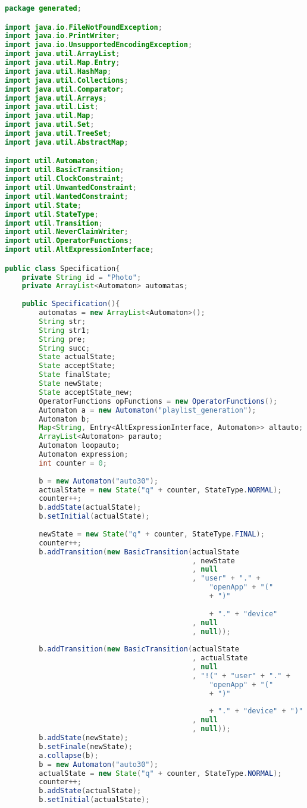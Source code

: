 \begin{lstlisting}[language=java, caption={\textit{Specification} osztály.},captionpos=b,label=specification_class]
package generated;

import java.io.FileNotFoundException;
import java.io.PrintWriter;
import java.io.UnsupportedEncodingException;
import java.util.ArrayList;
import java.util.Map.Entry;
import java.util.HashMap;
import java.util.Collections;
import java.util.Comparator;
import java.util.Arrays;
import java.util.List;
import java.util.Map;
import java.util.Set;
import java.util.TreeSet;
import java.util.AbstractMap;

import util.Automaton;
import util.BasicTransition;
import util.ClockConstraint;
import util.UnwantedConstraint;
import util.WantedConstraint;
import util.State;
import util.StateType;
import util.Transition;
import util.NeverClaimWriter;
import util.OperatorFunctions;
import util.AltExpressionInterface;

public class Specification{
	private String id = "Photo";
	private ArrayList<Automaton> automatas;
	
	public Specification(){
		automatas = new ArrayList<Automaton>();
		String str;
		String str1;
		String pre;
		String succ;
		State actualState;
		State acceptState;
		State finalState;
		State newState;
		State acceptState_new;
		OperatorFunctions opFunctions = new OperatorFunctions();
		Automaton a = new Automaton("playlist_generation");
		Automaton b;
		Map<String, Entry<AltExpressionInterface, Automaton>> altauto;
		ArrayList<Automaton> parauto;
		Automaton loopauto;
		Automaton expression;
		int counter = 0;
		
		b = new Automaton("auto30");
		actualState = new State("q" + counter, StateType.NORMAL);
		counter++;
		b.addState(actualState);
		b.setInitial(actualState);
		
		newState = new State("q" + counter, StateType.FINAL);
		counter++;
		b.addTransition(new BasicTransition(actualState
											, newState
											, null
											, "user" + "." +	
												"openApp" + "("
												+ ")"
												
												+ "." + "device"
											, null
											, null));
											
		b.addTransition(new BasicTransition(actualState
											, actualState
											, null
											, "!(" + "user" + "." +	
												"openApp" + "("
												+ ")"
												
												+ "." + "device" + ")"
											, null
											, null));
		b.addState(newState);
		b.setFinale(newState);
		a.collapse(b);
		b = new Automaton("auto30");
		actualState = new State("q" + counter, StateType.NORMAL);
		counter++;
		b.addState(actualState);
		b.setInitial(actualState);
		

\end{lstlisting}
